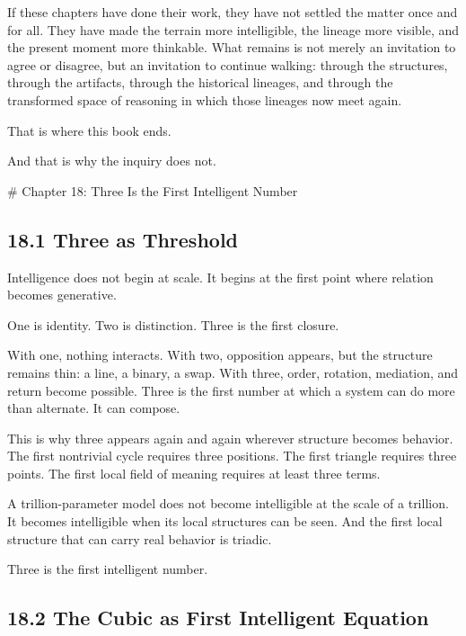 \documentclass[
]{article}
\begin{document}
If these chapters have done their work, they have not settled the matter
once and for all. They have made the terrain more intelligible, the
lineage more visible, and the present moment more thinkable. What
remains is not merely an invitation to agree or disagree, but an
invitation to continue walking: through the structures, through the
artifacts, through the historical lineages, and through the transformed
space of reasoning in which those lineages now meet again.

That is where this book ends.

And that is why the inquiry does not.

\newpage
\vspace*{3cm}
\begin{center}
# Chapter 18: Three Is the First Intelligent Number
\end{center}

\hypertarget{three-as-threshold}{%
\subsection{18.1 Three as Threshold}\label{three-as-threshold}}

Intelligence does not begin at scale. It begins at the first point where
relation becomes generative.

One is identity. Two is distinction. Three is the first closure.

With one, nothing interacts. With two, opposition appears, but the
structure remains thin: a line, a binary, a swap. With three, order,
rotation, mediation, and return become possible. Three is the first
number at which a system can do more than alternate. It can compose.

This is why three appears again and again wherever structure becomes
behavior. The first nontrivial cycle requires three positions. The first
triangle requires three points. The first local field of meaning
requires at least three terms.

A trillion-parameter model does not become intelligible at the scale of
a trillion. It becomes intelligible when its local structures can be
seen. And the first local structure that can carry real behavior is
triadic.

Three is the first intelligent number.

\hypertarget{the-cubic-as-first-intelligent-equation}{%
\subsection{18.2 The Cubic as First Intelligent
Equation}\label{the-cubic-as-first-intelligent-equation}}
\end{document}
